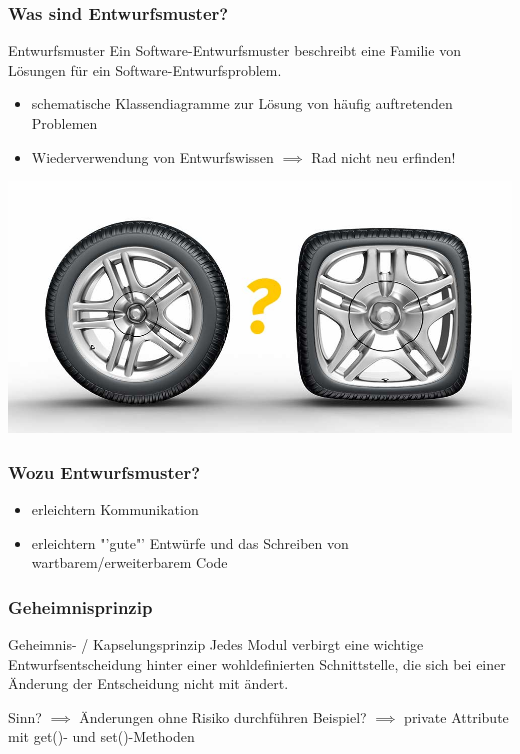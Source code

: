 \documentclass[18pt]{beamer}
\begin{document}
	\begin{frame}
		\frametitle{Was sind Entwurfsmuster?}
		\begin{block}{Entwurfsmuster}
			Ein Software-Entwurfsmuster beschreibt eine
			Familie von Lösungen für ein Software-Entwurfsproblem.
		\end{block}
		\pause
		\begin{itemize}
			\item schematische Klassendiagramme zur Lösung von häufig auftretenden Problemen \pause
			\item Wiederverwendung von Entwurfswissen $\implies$ Rad nicht neu erfinden!
		\end{itemize}
		\pause
		\centering
		\includegraphics[scale=0.2]{./pics/tut3/new-wheel.jpg}
	\end{frame}

	\begin{frame}
		\frametitle{Wozu Entwurfsmuster?}
		\begin{itemize}
			\item erleichtern Kommunikation \pause
			\item erleichtern "'gute"' Entwürfe und das Schreiben von wartbarem/erweiterbarem Code
		\end{itemize}
\end{frame}
	
	\begin{frame}
		\frametitle{Geheimnisprinzip}
		\begin{block}{Geheimnis- / Kapselungsprinzip}
			Jedes Modul verbirgt eine wichtige
			Entwurfsentscheidung hinter einer
			wohldefinierten Schnittstelle, die sich bei einer
			Änderung der Entscheidung nicht mit ändert.
		\end{block}
		\pause
		Sinn? \pause $\implies$ Änderungen ohne Risiko durchführen \linebreak \pause
		Beispiel? \pause $\implies$ private Attribute mit get()- und set()-Methoden
	\end{frame}
\end{document}
